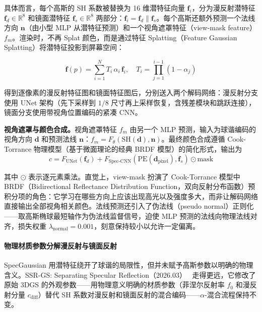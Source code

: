 具体而言，每个高斯的 SH 系数被替换为 16 维潜特征向量 $\mathbf{f}_i$，分为漫反射潜特征 $\mathbf{f}_d \in \mathbb{R}^8$ 和镜面潜特征 $\mathbf{f}_s \in \mathbb{R}^8$ 两部分：$\mathbf{f}_i = \mathbf{f}_d \parallel \mathbf{f}_s$。每个高斯还额外预测一个法线方向 $\mathbf{n}$（由小型 MLP 从潜特征预测）和一个视角遮罩特征（view-mask feature）$f_m$。渲染时，不再 Splat 颜色，而是通过特征 Splatting（Feature Gaussian Splatting）将潜特征投影到屏幕空间：

\begin{equation}
\mathbf{f}(p) = \sum_{i=1}^{N} T_i \, \alpha_i \, \mathbf{f}_i, \quad T_i = \prod_{j=1}^{i-1}(1 - \alpha_j)
\end{equation}

得到逐像素的漫反射特征图和镜面特征图后，分别送入两个解码网络：漫反射分支使用 UNet 架构（先下采样到 $1/8$ 尺寸再上采样恢复，含残差模块和跳跃连接），镜面分支使用带视角位置编码的紧凑 CNN。

\textbf{视角遮罩与颜色合成。}视角遮罩特征 $f_m$ 由另一个 MLP 预测，输入为球谐编码的视角方向 $\mathbf{d}$ 和预测法线 $\mathbf{n}$：$f_m = F_\theta(\text{SH}(\mathbf{d}), \mathbf{n})$。最终颜色合成遵循 Cook-Torrance 物理模型（基于微面理论的经典 BRDF 模型）的简化形式，输出为
\begin{equation}
c = F_{\text{UNet}}(\mathbf{f}_d) + F_{\text{Spec-CNN}}(\text{PE}(\mathbf{d}_{\text{pixel}}), \mathbf{f}_s) \odot \text{mask}
\end{equation}

其中 $\odot$ 表示逐元素乘法。直觉上，view-mask 扮演了 Cook-Torrance 模型中 BRDF（Bidirectional Reflectance Distribution Function，双向反射分布函数）预积分项的角色：它学习在哪些方向上应该出现高光以及强度多大，而非让解码网络直接输出全部视角相关颜色。法线预测还引入了伪法线（pseudo normal）正则化——取高斯椭球最短轴作为伪法线监督信号，迫使 MLP 预测的法线向物理法线对齐，损失权重 $\lambda_{\text{normal}} = 0.001$，刻意保持较小以允许一定偏离。

\paragraph{物理材质参数分解漫反射与镜面反射}

SpecGaussian 用潜特征绕开了球谐的局限性，但并未赋予高斯参数以明确的物理含义。SSR-GS: Separating Specular Reflection（2026.03）~\cite{2603_05152} 走得更远，它修改了原始 3DGS 的外观参数——用物理意义明确的材质参数（菲涅尔反射率 $f_0$ 和漫反射分量 $c_{\text{diff}}$）替代 SH 系数对漫反射和镜面反射的混合编码——$\alpha$-混合流程保持不变。

